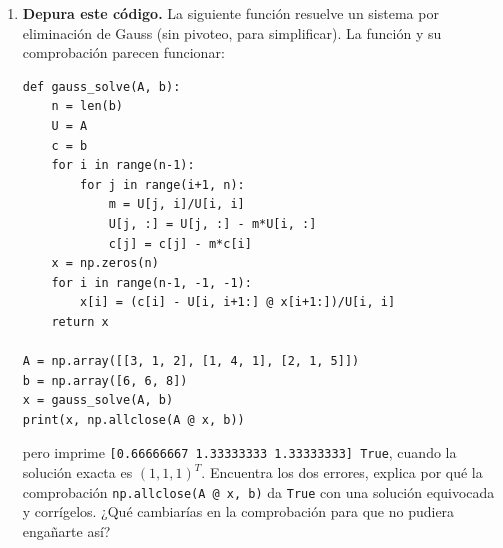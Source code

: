 \begin{enumerate}
\begin{verbatim}
# (b): same loop, but with  xs1 = w*xs1 + (1 - w)*xs  as the last line
#      inside the loop over i
# (c): same loop, but with  xs1[i] = w*xs1[i] + (1 - w)*xs[i]  as the
#      last line inside the loop over i
\end{verbatim}
\begin{enumerate}
\item Sin ejecutarlas, di cuál es el método SOR y qué método iterativo implementa cada una de las otras.
\item Escribe las tres funciones y compara una iteración de cada una con la forma matricial del método SOR, $f+H\cdot x$, partiendo de $x=(1,1,1)^T$, para el sistema del texto con matriz $\left(\begin{smallmatrix}4&2&-1\\3&-5&1\\1&-1&6\end{smallmatrix}\right)$ y $\omega=0.8$.
\item Resuelve con las tres el sistema de la cuerda de la sección \ref{sec:parada_it} con $\omega=1.5$ y tolerancia $10^{-8}$. ¿Cuántas iteraciones necesita cada una? ¿Convergen todas a la solución correcta? Haz lo mismo con el sistema anterior y $\omega=0.8$. ¿Qué te enseña esto sobre comprobar un método iterativo solo mirando si \emph{converge}?
\end{enumerate}

\item \label{ej:depura_gauss} \textbf{Depura este código.} La siguiente función resuelve un sistema por eliminación de Gauss (sin pivoteo, para simplificar). La función y su comprobación parecen funcionar:
\begin{verbatim}
def gauss_solve(A, b):
    n = len(b)
    U = A
    c = b
    for i in range(n-1):
        for j in range(i+1, n):
            m = U[j, i]/U[i, i]
            U[j, :] = U[j, :] - m*U[i, :]
            c[j] = c[j] - m*c[i]
    x = np.zeros(n)
    for i in range(n-1, -1, -1):
        x[i] = (c[i] - U[i, i+1:] @ x[i+1:])/U[i, i]
    return x

A = np.array([[3, 1, 2], [1, 4, 1], [2, 1, 5]])
b = np.array([6, 6, 8])
x = gauss_solve(A, b)
print(x, np.allclose(A @ x, b))
\end{verbatim}
pero imprime \texttt{[0.66666667 1.33333333 1.33333333] True}, cuando la solución exacta es $(1,1,1)^T$. Encuentra los dos errores, explica por qué la comprobación \texttt{np.allclose(A @ x, b)} da \texttt{True} con una solución equivocada y corrígelos. ¿Qué cambiarías en la comprobación para que no pudiera engañarte así?


\end{enumerate}
